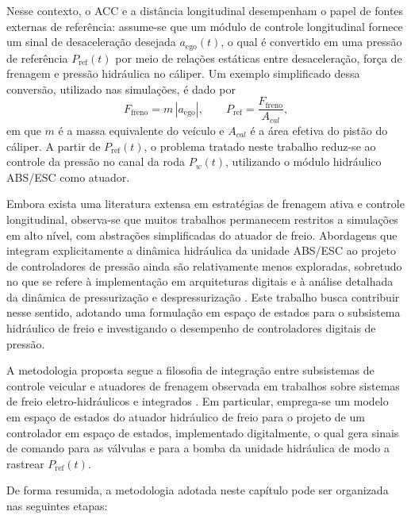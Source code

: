 Nesse contexto, o ACC e a distância longitudinal desempenham o papel de fontes externas de referência: assume-se que um módulo de controle longitudinal fornece um sinal de desaceleração desejada $a_{\mathrm{ego}}(t)$, o qual é convertido em uma pressão de referência $P_{\mathrm{ref}}(t)$ por meio de relações estáticas entre desaceleração, força de frenagem e pressão hidráulica no cáliper. Um exemplo simplificado dessa conversão, utilizado nas simulações, é dado por
\[
    F_{\mathrm{freno}} = m\,|a_{\mathrm{ego}}|, 
    \qquad
    P_{\mathrm{ref}} = \frac{F_{\mathrm{freno}}}{A_{cal}},
\]
em que $m$ é a massa equivalente do veículo e $A_{cal}$ é a área efetiva do pistão do cáliper. A partir de $P_{\mathrm{ref}}(t)$, o problema tratado neste trabalho reduz-se ao controle da pressão no canal da roda $P_w(t)$, utilizando o módulo hidráulico ABS/ESC como atuador.

Embora exista uma literatura extensa em estratégias de frenagem ativa e controle longitudinal, observa-se que muitos trabalhos permanecem restritos a simulações em alto nível, com abstrações simplificadas do atuador de freio. Abordagens que integram explicitamente a dinâmica hidráulica da unidade ABS/ESC ao projeto de controladores de pressão ainda são relativamente menos exploradas, sobretudo no que se refere à implementação em arquiteturas digitais e à análise detalhada da dinâmica de pressurização e despressurização \cite{HouhuaJing2022,PressureCoordinatedControl2023}. Este trabalho busca contribuir nesse sentido, adotando uma formulação em espaço de estados para o subsistema hidráulico de freio e investigando o desempenho de controladores digitais de pressão.

A metodologia proposta segue a filosofia de integração entre subsistemas de controle veicular e atuadores de frenagem observada em trabalhos sobre sistemas de freio eletro-hidráulicos e integrados \cite{HouhuaJing2022,PressureCoordinatedControl2023,MotorParametricDesign2023}. Em particular, emprega-se um modelo em espaço de estados do atuador hidráulico de freio para o projeto de um controlador em espaço de estados, implementado digitalmente, o qual gera sinais de comando para as válvulas e para a bomba da unidade hidráulica de modo a rastrear $P_{\mathrm{ref}}(t)$.

De forma resumida, a metodologia adotada neste capítulo pode ser organizada nas seguintes etapas:

